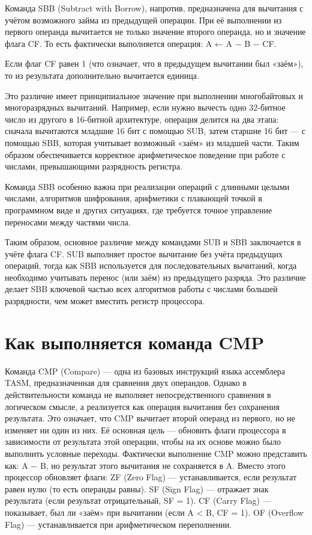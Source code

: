 Команда SBB (Subtract with Borrow), напротив, предназначена для вычитания с учётом возможного займа из предыдущей операции.
При её выполнении из первого операнда вычитается не только значение второго операнда, но и значение флага CF.
То есть фактически выполняется операция: A ← A − B − CF.

Если флаг CF равен 1 (что означает, что в предыдущем вычитании был «заём»), то из результата дополнительно вычитается единица.

Это различие имеет принципиальное значение при выполнении многобайтовых и многоразрядных вычитаний.
Например, если нужно вычесть одно 32-битное число из другого в 16-битной архитектуре, операция делится на два этапа: сначала вычитаются младшие 16 бит с помощью SUB, затем старшие 16 бит — с помощью SBB, которая учитывает возможный «заём» из младшей части.
Таким образом обеспечивается корректное арифметическое поведение при работе с числами, превышающими разрядность регистра.

Команда SBB особенно важна при реализации операций с длинными целыми числами, алгоритмов шифрования, арифметики с плавающей точкой в программном виде и других ситуациях, где требуется точное управление переносами между частями числа.

Таким образом, основное различие между командами SUB и SBB заключается в учёте флага CF.
SUB выполняет простое вычитание без учёта предыдущих операций, тогда как SBB используется для последовательных вычитаний, когда необходимо учитывать перенос (или заём) из предыдущего разряда.
Это различие делает SBB ключевой частью всех алгоритмов работы с числами большей разрядности, чем может вместить регистр процессора.

\section{Как выполняется команда CMP}

Команда CMP (Compare) — одна из базовых инструкций языка ассемблера TASM, предназначенная для сравнения двух операндов.
Однако в действительности команда не выполняет непосредственного сравнения в логическом смысле, а реализуется как операция вычитания без сохранения результата.
Это означает, что CMP вычитает второй операнд из первого, но не изменяет ни один из них.
Её основная цель — обновить флаги процессора в зависимости от результата этой операции, чтобы на их основе можно было выполнить условные переходы.
Фактически выполнение CMP можно представить как: A − B, но результат этого вычитания не сохраняется в A.
Вместо этого процессор обновляет флаги:
ZF (Zero Flag) — устанавливается, если результат равен нулю (то есть операнды равны).
SF (Sign Flag) — отражает знак результата (если результат отрицательный, SF = 1).
CF (Carry Flag) — показывает, был ли «заём» при вычитании (если A < B, CF = 1).
OF (Overflow Flag) — устанавливается при арифметическом переполнении.

